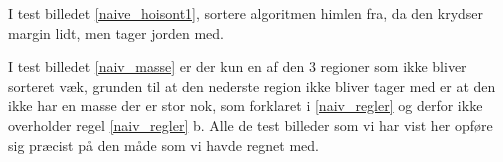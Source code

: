 \begin{figure}[!h]
    \centering
		\hspace{1em}
\end{figure}

I test billedet \ref{naive_hoisont1}, sortere algoritmen
himlen fra, da den krydser margin lidt, men tager jorden med. 


\begin{figure}[!h]
    \centering
		\hspace{1em}
\end{figure}

I test billedet \ref{naiv_masse} er der kun en af den 3 regioner som ikke
bliver sorteret væk, grunden til at den nederste region ikke bliver
tager med er at den ikke har en masse der er stor nok, som forklaret i
\ref{naiv_regler} og derfor ikke overholder regel \ref{naiv_regler} b. Alle de test
billeder som vi har vist her opføre sig præcist på den måde som vi havde
regnet med. 


